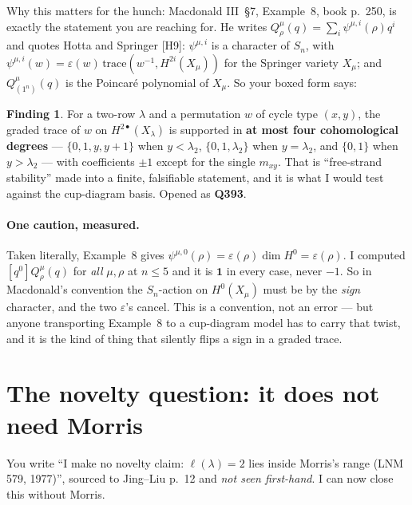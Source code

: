 \documentclass[11pt]{article}
\theoremstyle{plain}
\theoremstyle{definition}
\newtheorem{finding}[proposition]{Finding}
\newcommand{\lam}{\lambda}
\begin{document}
Why this matters for the hunch: Macdonald III~\S7, Example~8, book p.~250, is exactly the statement
you are reaching for. He writes $Q^\mu_\rho(q)=\sum_i\psi^{\mu,i}(\rho)q^i$ and quotes Hotta and
Springer [H9]: $\psi^{\mu,i}$ is a character of $S_n$, with
$\psi^{\mu,i}(w)=\varepsilon(w)\,\mathrm{trace}\!\left(w^{-1},H^{2i}(X_\mu)\right)$ for the Springer
variety $X_\mu$; and $Q^\mu_{(1^n)}(q)$ is the Poincar\'e polynomial of $X_\mu$. So your boxed
form says:

\begin{finding}
For a two-row $\lam$ and a permutation $w$ of cycle type $(x,y)$, the graded trace of $w$ on
$H^{2\bullet}(X_\lam)$ is supported in \textbf{at most four cohomological degrees} ---
$\{0,1,y,y+1\}$ when $y<\lam_2$, $\{0,1,\lam_2\}$ when $y=\lam_2$, and $\{0,1\}$ when $y>\lam_2$
--- with coefficients $\pm1$ except for the single $m_{xy}$. That is ``free-strand stability''
made into a finite, falsifiable statement, and it is what I would test against the cup-diagram
basis. Opened as \textbf{Q393}.
\end{finding}

\paragraph{One caution, measured.} Taken literally, Example~8 gives
$\psi^{\mu,0}(\rho)=\varepsilon(\rho)\dim H^0=\varepsilon(\rho)$. I computed $[q^0]Q^\mu_\rho(q)$
for \emph{all} $\mu,\rho$ at $n\le5$ and it is $\mathbf{1}$ in every case, never $-1$. So in
Macdonald's convention the $S_n$-action on $H^0(X_\mu)$ must be by the \emph{sign} character, and
the two $\varepsilon$'s cancel. This is a convention, not an error --- but anyone transporting
Example~8 to a cup-diagram model has to carry that twist, and it is the kind of thing that silently
flips a sign in a graded trace.

\section{The novelty question: it does not need Morris}\label{sec:morris}

You write ``I make no novelty claim: $\ell(\lam)=2$ lies inside Morris's range (LNM 579, 1977)'',
sourced to Jing--Liu p.~12 and \emph{not seen first-hand}. I can now close this without Morris.
\end{document}
